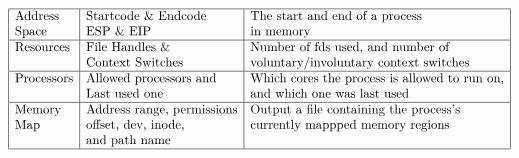 \documentclass[12pt]{extarticle}
\begin{document}
\begin{displaymath}
\begin{array}{|l|l|l|}
    \hline
        \text{Address} & \text{Startcode \& Endcode} & \text{The start and end of a process} \\
        \text{Space}   & \text{ESP \& EIP}           & \text{in memory} \\
    \hline
        \text{Resources} & \text{File Handles \&} & \text{Number of fds used, and number of} \\
        \hspace{1cm}     & \text{Context Switches} & \text{voluntary/involuntary context switches} \\
    \hline
        \text{Processors} & \text{Allowed processors and} & \text{Which cores the process is allowed to run on,} \\
        \hspace{1cm}      & \text{Last used one} & \text{and which one was last used} \\
    \hline
        \text{Memory} & \text{Address range, permissions} & \text{Output a file containing the process's} \\
        \text{Map}    & \text{offset, dev, inode,} & \text{currently mappped memory regions} \\
        \hspace{1cm}  & \text{and path name}       & \hspace{1cm} \\
    \hline
    \end{array}
\end{displaymath}
\end{document}
